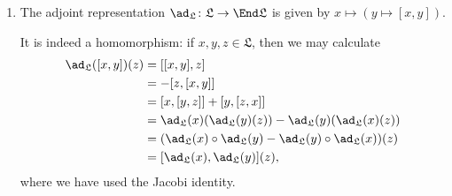 \begin{enumerate}[label=(\arabic*)]
	\item The adjoint representation $\ad_{\mathfrak{L}}\colon \mathfrak{L}\to\End \mathfrak{L}$
		is given by $x\mapsto (y\mapsto [x, y])$.

		It is indeed a homomorphism: if $x, y, z \in \mathfrak{L}$, then we may
		calculate
		\begin{align*}
			\ad_{\mathfrak{L}}([x, y])(z)
			&= [[x, y], z]\\
			&= -[z, [x, y]]\\
			&= [x, [y, z]] + [y, [z, x]]\\
			&= \ad_{\mathfrak{L}}(x)(\ad_{\mathfrak{L}}(y)(z)) - \ad_{\mathfrak{L}}(y)(\ad_{\mathfrak{L}}(x)(z))\\
			&= (\ad_{\mathfrak{L}}(x)\circ\ad_{\mathfrak{L}}(y) - \ad_{\mathfrak{L}}(y) \circ \ad_{\mathfrak{L}}(x))(z)\\
			&= [\ad_{\mathfrak{L}}(x), \ad_{\mathfrak{L}}(y)](z),
		\end{align*}
		where we have used the Jacobi identity.
\end{enumerate}
